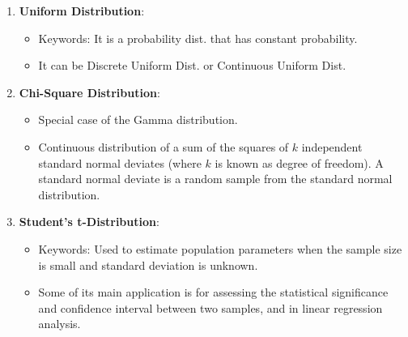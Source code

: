 \documentclass[11pt, twocolumn]{article}
\begin{document}
\begin{itemize}
\begin{enumerate}
\item \textbf{Uniform Distribution}: 
\begin{itemize}
\item  Keywords: It is a probability dist. that has {\color{blue} constant} probability. 
\item It can be Discrete Uniform Dist. or Continuous Uniform Dist.
\end{itemize}

\item \textbf{Chi-Square Distribution}:
\begin{itemize}
\item Special case of the Gamma distribution.
\item {\color{blue} Continuous} distribution of a sum of the squares of $k$ independent {\color{blue} standard normal deviates} (where $k$ is known as {\color{blue} degree of freedom}).  A standard normal deviate is a {\color{blue} random sample} from the {\color{blue} standard normal distribution}.
\end{itemize}
	
\item \textbf{Student's t-Distribution}:  
\begin{itemize}
\item  Keywords: Used to {\color{blue} estimate population} parameters when the sample size is {\color{blue} small} and standard deviation is {\color{blue} unknown}. 
\item Some of its main application is for assessing the statistical {\color{blue} significance} and confidence interval between two samples, and in linear regression analysis. 
\end{itemize}
\end{enumerate}
\end{itemize}
\end{document}
